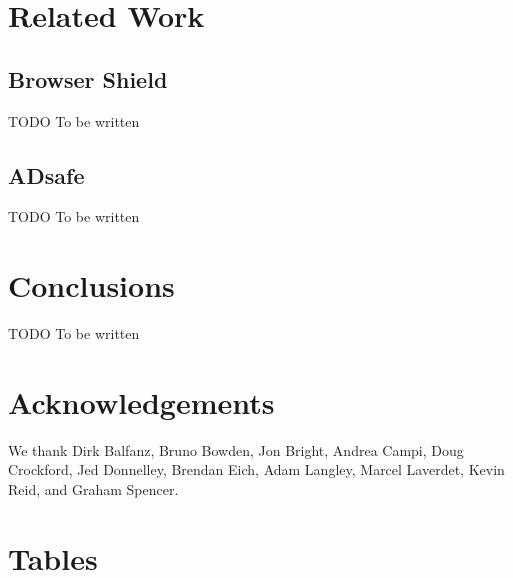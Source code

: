 \documentclass[letterpaper,twocolumn,10pt]{article}
\begin{document}
\section{Related Work}
\label{sec:related}

\subsection{Browser Shield}

TODO To be written

\subsection{ADsafe}

TODO To be written

\section{Conclusions}

TODO To be written

\section{Acknowledgements}

We thank 
Dirk Balfanz,
Bruno Bowden,
Jon Bright,
Andrea Campi,
Doug Crockford,
Jed Donnelley,
Brendan Eich,
Adam Langley,
Marcel Laverdet,
Kevin Reid,
and
Graham Spencer.

\appendix

\section{Tables}
\end{document}
